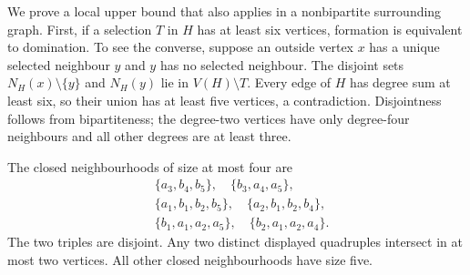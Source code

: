 \documentclass[11pt]{article}
\begin{document}
We prove a local upper bound that also applies in a nonbipartite
surrounding graph. First, if a selection $T$ in $H$ has at least six
vertices, formation is equivalent to domination. To see the converse,
suppose an outside vertex $x$ has a unique selected neighbour $y$ and
$y$ has no selected neighbour. The disjoint sets $N_H(x)\setminus\{y\}$
and $N_H(y)$ lie in $V(H)\setminus T$. Every edge of $H$ has degree sum
at least six, so their union has at least five vertices, a contradiction.
Disjointness follows from bipartiteness; the degree-two vertices have
only degree-four neighbours and all other degrees are at least three.

The closed neighbourhoods of size at most four are
\begin{align*}
 &\{a_3,b_4,b_5\},\quad\{b_3,a_4,a_5\},\\
 &\{a_1,b_1,b_2,b_5\},\quad\{a_2,b_1,b_2,b_4\},\\
 &\{b_1,a_1,a_2,a_5\},\quad\{b_2,a_1,a_2,a_4\}.
\end{align*}
The two triples are disjoint. Any two distinct displayed quadruples
intersect in at most two vertices. All other closed neighbourhoods have
size five.
\end{document}
